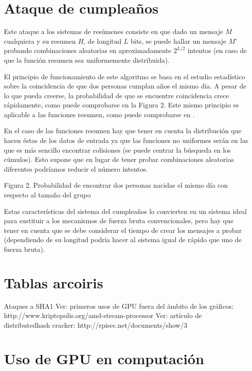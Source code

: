 \section{Ataque de cumpleaños}

Este ataque a los sistemas de resúmenes consiste en que dado un mensaje $M$ cualquiera y su resumen $H$, de longitud $L$ bits, se puede hallar un mensaje $M’$ probando combinaciones aleatorias en aproximadamente $2^{L/2}$ intentos (en caso de que la función resumen sea uniformemente distribuida).

El principio de funcionamiento de este algoritmo se basa en el estudio estadístico sobre la coincidencia de que dos personas cumplan años el mismo día. A pesar de lo que pueda creerse, la probabilidad de que se encuentre coincidencia crece rápidamente, como puede comprobarse en la Figura 2. Este mismo principio es aplicable a las funciones resumen, como puede comprobarse en \cite{Bellare04hashfunction}.

En el caso de las funciones resumen hay que tener en cuenta la distribución que hacen éstas de los datos de entrada ya que las funciones no uniformes serán en las que es más sencillo encontrar colisiones (se puede centrar la búsqueda en los cúmulos). Esto supone que en lugar de tener probar   combinaciones aleatorias diferentes podríamos reducir el número intentos.
 
Figura 2. Probabilidad de encontrar dos personas nacidas el mismo día con respecto al tamaño del grupo

Estas características del sistema del cumpleaños lo convierten en un sistema ideal para sustituir a los mecanismos de fuerza bruta convencionales, pero hay que tener en cuenta que se debe considerar el tiempo de crear los mensajes a probar (dependiendo de su longitud podría hacer al sistema igual de rápido que uno de fuerza bruta).

\section{Tablas arcoiris}

Ataques a SHA1
Ver: primeros usos de GPU fuera del ámbito de los gráficos: http://www.kriptopolis.org/amd-stream-processor
Ver: artículo de distributedhash cracker: http://rpisec.net/documents/show/3

\section{Uso de GPU en computación}

